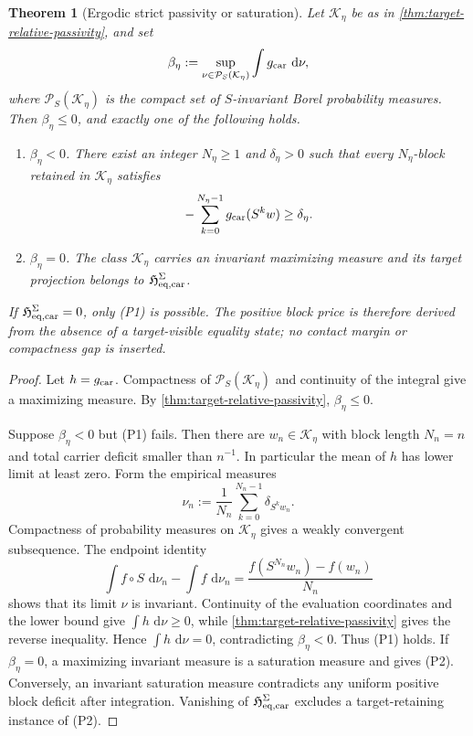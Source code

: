 \documentclass[11pt]{article}
\numberwithin{section}{part}
\theoremstyle{plain}
\newtheorem{theorem}{Theorem}[section]
\theoremstyle{definition}
\theoremstyle{remark}
\newcommand{\dd}{\,\mathrm d}
\begin{document}
\begin{theorem}[Ergodic strict passivity or saturation]
\label{thm:strict-passivity-or-saturation}
Let \(\mathcal K_\eta\) be as in
\cref{thm:target-relative-passivity}, and set
\begin{equation}
 \label{eq:maximal-invariant-carrier-average}
 \beta_\eta
 :=\sup_{\nu\in\mathcal P_S(\mathcal K_\eta)}
   \int g_{\rm car}\,\dd\nu,
\end{equation}
where \(\mathcal P_S(\mathcal K_\eta)\) is the compact set of
\(S\)-invariant Borel probability measures.  Then
\(\beta_\eta\le0\), and exactly one of the following holds.
\begin{enumerate}[label=\textup{(P\arabic*)}]
\item \(\beta_\eta<0\).  There exist an integer \(N_\eta\ge1\) and
  \(\delta_\eta>0\) such that
  every \(N_\eta\)-block retained in \(\mathcal K_\eta\) satisfies
  \begin{equation}
   \label{eq:strict-block-passivity}
   -\sum_{k=0}^{N_\eta-1}g_{\rm car}(S^kw)
   \ge\delta_\eta.
  \end{equation}
\item \(\beta_\eta=0\).  The class \(\mathcal K_\eta\) carries an invariant
  maximizing measure and its
  target projection belongs to
  \(\mathfrak H_{\rm eq,car}^{\Sigma}\).
\end{enumerate}
If \(\mathfrak H_{\rm eq,car}^{\Sigma}=0\), only \textup{(P1)} is possible.
The positive block price is therefore derived from the absence of a
target-visible equality state; no contact margin or compactness gap is inserted.
\end{theorem}

\begin{proof}
Let \(h=g_{\rm car}\).  Compactness of
\(\mathcal P_S(\mathcal K_\eta)\) and continuity of the integral give a
maximizing measure.  By \cref{thm:target-relative-passivity},
\(\beta_\eta\le0\).

Suppose \(\beta_\eta<0\) but \textup{(P1)} fails.  Then there are
\(w_n\in\mathcal K_\eta\) with block length \(N_n=n\) and total carrier
deficit smaller than \(n^{-1}\).  In particular the mean of \(h\) has
lower limit at least zero.  Form
the empirical measures
\[
 \nu_n:=\frac1{N_n}\sum_{k=0}^{N_n-1}\delta_{S^kw_n}.
\]
Compactness of probability measures on \(\mathcal K_\eta\) gives a weakly
convergent subsequence.  The endpoint identity
\[
 \int f\circ S\,\dd\nu_n-\int f\,\dd\nu_n
 =\frac{f(S^{N_n}w_n)-f(w_n)}{N_n}
\]
shows that its limit \(\nu\) is invariant.  Continuity of the evaluation
coordinates and the lower bound give \(\int h\,\dd\nu\ge0\), while
\cref{thm:target-relative-passivity} gives the reverse inequality.  Hence
\(\int h\,\dd\nu=0\), contradicting
\(\beta_\eta<0\).  Thus \textup{(P1)} holds.  If
\(\beta_\eta=0\), a maximizing invariant measure is a saturation measure and
gives \textup{(P2)}.  Conversely, an invariant saturation measure contradicts
any uniform positive block deficit after integration.  Vanishing of
\(\mathfrak H_{\rm eq,car}^{\Sigma}\) excludes a target-retaining instance of
\textup{(P2)}.
\end{proof}
\end{document}
